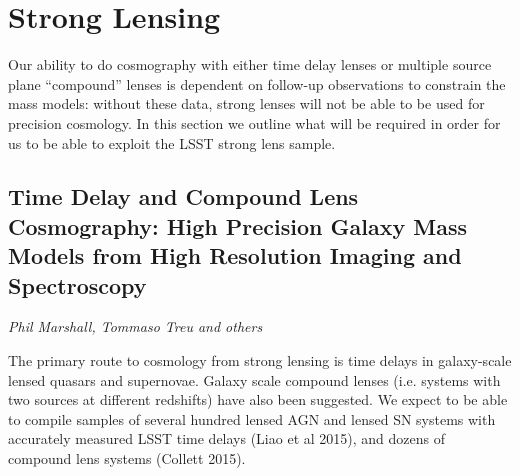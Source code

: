 
\section{Strong Lensing}
\label{sec:sl}

Our ability to do cosmography with either time delay lenses or multiple 
source plane ``compound'' lenses is dependent on follow-up observations
to constrain the mass models: without these data, strong lenses will not
be able to be used for precision cosmology. In this section we outline what will be 
required in order for us to be able to exploit the LSST strong lens sample.


\subsection{Time Delay and Compound Lens Cosmography: High Precision Galaxy Mass Models from High Resolution Imaging and Spectroscopy}
{\it Phil Marshall, Tommaso Treu and others}

The primary route to cosmology from strong lensing is time delays in
galaxy-scale lensed quasars and supernovae. Galaxy scale compound lenses
(i.e. systems with two sources at different redshifts) have also been
suggested. We expect to be able to compile samples of several hundred lensed AGN
and lensed SN systems with accurately measured LSST time delays (Liao et al 2015), 
and dozens of compound lens systems (Collett 2015).

